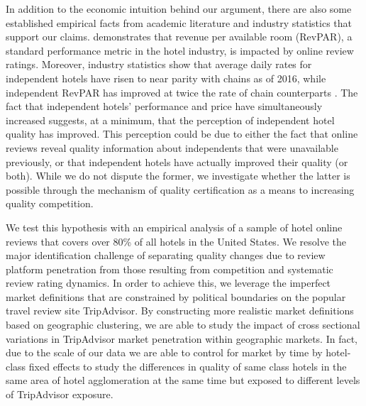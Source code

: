 \documentclass[mksc,blindrev]{informs3} %
\begin{document}
In addition to the economic intuition behind our argument, there are also some established empirical facts from academic literature and industry statistics that support our claims.  demonstrates that revenue per available room (RevPAR), a standard performance metric in the hotel industry, is impacted by online review ratings. Moreover, industry statistics show that average daily rates for independent hotels have risen to near parity with chains as of 2016, while independent RevPAR has improved at twice the rate of chain counterparts \citep{lodging2017}. The fact that independent hotels' performance and price have simultaneously increased suggests, at a minimum, that the perception of independent hotel quality has improved. This perception could be due to either the fact that online reviews reveal quality information about independents that were unavailable previously, or that independent hotels have actually improved their quality (or both). While we do not dispute the former, we investigate whether the latter is possible through the mechanism of quality certification as a means to increasing quality competition.

We test this hypothesis with an empirical analysis of a sample of hotel online reviews that covers over 80\% of all hotels in the United States. We resolve the major identification challenge of separating quality changes due to review platform penetration from those resulting from competition and systematic review rating dynamics. In order to achieve this, we leverage the imperfect market definitions that are constrained by political boundaries on the popular travel review site TripAdvisor. By constructing more realistic market definitions based on geographic clustering, we are able to study the impact of cross sectional variations in TripAdvisor market penetration within geographic markets. In fact, due to the scale of our data we are able to control for market by time by hotel-class fixed effects to study the differences in quality of same class hotels in the same area of hotel agglomeration at the same time but exposed to different levels of TripAdvisor exposure.

\end{document}
